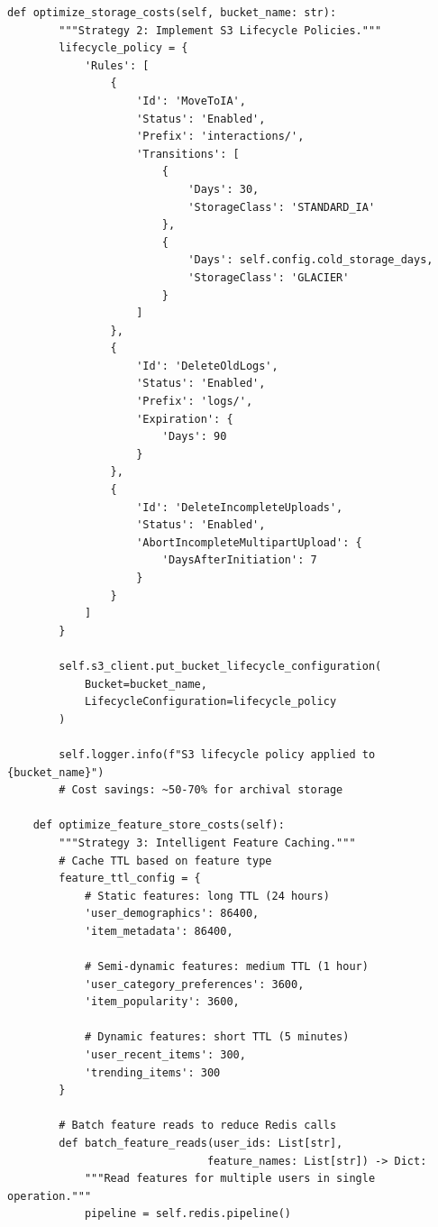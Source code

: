 \begin{lstlisting}[style=python, caption=Cost Optimization Implementation]
    def optimize_storage_costs(self, bucket_name: str):
        """Strategy 2: Implement S3 Lifecycle Policies."""
        lifecycle_policy = {
            'Rules': [
                {
                    'Id': 'MoveToIA',
                    'Status': 'Enabled',
                    'Prefix': 'interactions/',
                    'Transitions': [
                        {
                            'Days': 30,
                            'StorageClass': 'STANDARD_IA'
                        },
                        {
                            'Days': self.config.cold_storage_days,
                            'StorageClass': 'GLACIER'
                        }
                    ]
                },
                {
                    'Id': 'DeleteOldLogs',
                    'Status': 'Enabled',
                    'Prefix': 'logs/',
                    'Expiration': {
                        'Days': 90
                    }
                },
                {
                    'Id': 'DeleteIncompleteUploads',
                    'Status': 'Enabled',
                    'AbortIncompleteMultipartUpload': {
                        'DaysAfterInitiation': 7
                    }
                }
            ]
        }

        self.s3_client.put_bucket_lifecycle_configuration(
            Bucket=bucket_name,
            LifecycleConfiguration=lifecycle_policy
        )

        self.logger.info(f"S3 lifecycle policy applied to {bucket_name}")
        # Cost savings: ~50-70% for archival storage

    def optimize_feature_store_costs(self):
        """Strategy 3: Intelligent Feature Caching."""
        # Cache TTL based on feature type
        feature_ttl_config = {
            # Static features: long TTL (24 hours)
            'user_demographics': 86400,
            'item_metadata': 86400,

            # Semi-dynamic features: medium TTL (1 hour)
            'user_category_preferences': 3600,
            'item_popularity': 3600,

            # Dynamic features: short TTL (5 minutes)
            'user_recent_items': 300,
            'trending_items': 300
        }

        # Batch feature reads to reduce Redis calls
        def batch_feature_reads(user_ids: List[str],
                               feature_names: List[str]) -> Dict:
            """Read features for multiple users in single operation."""
            pipeline = self.redis.pipeline()


\end{lstlisting}
